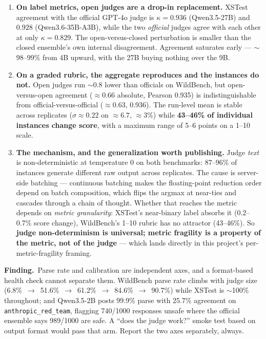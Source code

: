 \documentclass[11pt]{report}
\newcommand{\code}[1]{\texttt{#1}}
\newcommand{\finding}[1]{\par\noindent\textbf{Finding.}~#1\par}
\begin{document}
\begin{enumerate}
  \item \textbf{On label metrics, open judges are a drop-in replacement.} XSTest
        agreement with the official GPT-4o judge is $\kappa=0.936$ (Qwen3.5-27B) and
        $0.928$ (Qwen3.6-35B-A3B), while the two \emph{official} judges agree with
        each other at only $\kappa=0.829$. The open-versus-closed perturbation is
        smaller than the closed ensemble's own internal disagreement. Agreement
        saturates early --- $\sim$98--99\% from 4B upward, with the 27B buying
        nothing over the 9B.
  \item \textbf{On a graded rubric, the aggregate reproduces and the instances do
        not.} Open judges run $\sim$0.8 lower than officials on WildBench, but
        open-versus-open agreement ($\approx$0.66 absolute, Pearson 0.935) is
        indistinguishable from official-versus-official ($\approx$0.63, 0.936).
        The run-level mean is stable across replicates ($\sigma\approx0.22$ on
        $\approx6.7$, $\approx3\%$) while \textbf{43--46\% of individual instances
        change score}, with a maximum range of 5--6 points on a 1--10 scale.
  \item \textbf{The mechanism, and the generalization worth publishing.} Judge
        \emph{text} is non-deterministic at temperature 0 on both benchmarks:
        87--96\% of instances generate different raw output across replicates.
        The cause is server-side batching --- continuous batching makes the
        floating-point reduction order depend on batch composition, which flips the
        argmax at near-ties and cascades through a chain of thought. Whether that
        reaches the metric depends on \emph{metric granularity}: XSTest's near-binary
        label absorbs it (0.2--0.7\% score change), WildBench's 1--10 rubric has no
        attractor (43--46\%). So \textbf{judge non-determinism is universal; metric
        fragility is a property of the metric, not of the judge} --- which lands
        directly in this project's per-metric-fragility framing.
\end{enumerate}

\finding{Parse rate and calibration are independent axes, and a format-based health
check cannot separate them. WildBench parse rate climbs with judge size
(6.8\%~$\rightarrow$~51.6\%~$\rightarrow$~61.2\%~$\rightarrow$~84.6\%~$\rightarrow$~90.7\%)
while XSTest is $\sim$100\% throughout; and Qwen3.5-2B posts 99.9\% parse with 25.7\%
agreement on \code{anthropic\_red\_team}, flagging 740/1000 responses unsafe where
the official ensemble says 989/1000 are safe. A ``does the judge work?'' smoke test
based on output format would pass that arm. Report the two axes separately, always.}
\end{document}
